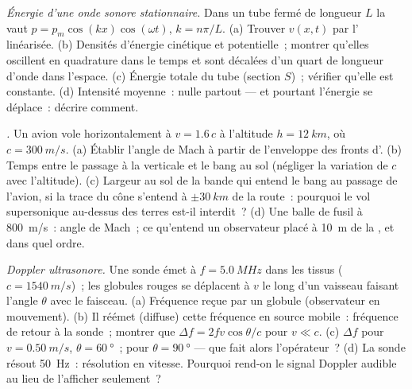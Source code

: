 \begin{exercise}[$\star\star\star$]\label{exo:b2:sound-waves:10}
\emph{Énergie d'une onde sonore stationnaire.} Dans un tube fermé de longueur $L$
la  vaut $p = p_m\cos(kx)\cos(\omega t)$, $k = n\pi/L$. (a) Trouver $v(x,
t)$ par l' linéarisée. (b) Densités d'énergie cinétique et
potentielle~; montrer qu'elles oscillent en quadrature dans le temps et
sont décalées d'un quart de longueur d'onde dans l'espace. (c) Énergie totale du
tube (section $S$)~; vérifier qu'elle est constante. (d) Intensité moyenne~: nulle
partout --- et pourtant l'énergie se déplace~: décrire comment.
\end{exercise}

\begin{exercise}[$\star\star\star$]\label{exo:b2:sound-waves:11}
\emph{.} Un avion vole horizontalement à $v = 1.6\,c$ à
l'altitude $h = \qty{12}{km}$, où $c = \qty{300}{m/s}$. (a) Établir l'angle de
Mach à partir de l'enveloppe des fronts d'. (b) Temps entre
le passage à la verticale et le bang au sol (négliger la variation
de $c$ avec l'altitude). (c) Largeur au sol de la bande qui entend
le bang au passage de l'avion, si la trace du cône s'entend à
$\pm\qty{30}{km}$ de la route~: pourquoi le vol supersonique au-dessus des terres
est-il interdit~? (d) Une balle de fusil à \qty{800}{m/s}~: angle de Mach~; ce qu'entend un observateur
placé à \qty{10}{m} de la , et dans quel ordre.
\end{exercise}

\begin{exercise}[$\star\star\star$]\label{exo:b2:sound-waves:12}
\emph{Doppler ultrasonore.} Une sonde émet à $f = \qty{5.0}{MHz}$ dans les tissus
($c = \qty{1540}{m/s}$)~; les globules rouges se déplacent à $v$ le long d'un vaisseau faisant
l'angle $\theta$ avec le faisceau. (a) Fréquence reçue par un globule (observateur
en mouvement). (b) Il réémet (diffuse) cette fréquence en source mobile~:
fréquence de retour à la sonde~; montrer que $\Delta f = 2fv\cos\theta/c$ pour $v \ll c$. (c)
$\Delta f$ pour $v = \qty{0.50}{m/s}$, $\theta = \qty{60}{\degree}$~; pour $\theta = \qty{90}{\degree}$
--- que fait alors l'opérateur~? (d) La sonde résout \qty{50}{Hz}~:
résolution en vitesse. Pourquoi rend-on le signal Doppler audible au lieu de
l'afficher seulement~?
\end{exercise}

